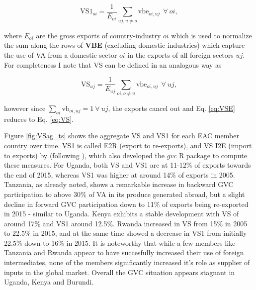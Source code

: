 \documentclass[a4paper]{article}
\begin{document}
\begin{equation} \label{eq:VS1}
\text{VS1}_{oi} = \frac{1}{E_{oi}} \sum_{uj, u \neq  o} \text{vbe}_{oi, uj}\ \ \forall\ oi,
\end{equation}

where $E_{oi}$ are the gross exports of country-industry $oi$ which is used to normalize the sum along the rows of \textbf{VBE} (excluding domestic industries) which capture the use of VA from a domestic sector $oi$ in the exports of all foreign sectors $uj$. For completeness I note that VS can be defined in an analogous way as

\begin{equation} \label{eq:VSE}
\text{VS}_{uj} = \frac{1}{E_{uj}} \sum_{oi, o \neq  u} \text{vbe}_{oi, uj}\ \ \forall\ uj,
\end{equation}

however since $\sum_{oi} \text{vb}_{oi, uj} = 1\ \forall\ uj$, the exports cancel out and Eq. \ref{eq:VSE} reduces to Eq. \ref{eq:VS}. \newline

Figure \ref{fig:VSag_ts} shows the aggregate VS and VS1 for each EAC member country over time. VS1 is called E2R (export to re-exports), and VS I2E (import to exports) by \citet{Kummritz20162} (following \citet{baldwin2015supply}), which also developed the $gvc$ R package to compute these measures. For Uganda, both VS and VS1 are at 11-12\% of exports towards the end of 2015, whereas VS1 was higher at around 14\% of exports in 2005. Tanzania, as already noted, shows a remarkable increase in backward GVC participation to above 30\% of VA in its produce generated abroad, but a slight decline in forward GVC participation down to 11\% of exports being re-exported in 2015 - similar to Uganda. Kenya exhibits a stable development with VS of around 17\% and VS1 around 12.5\%. Rwanda increased in VS from 15\% in 2005 to 22.5\% in 2015, and at the same time showed a decrease in VS1 from initially 22.5\% down to 16\% in 2015. It is noteworthy that while a few members like Tanzania and Rwanda appear to have succesfully increased their use of foreign intermediates, none of the members significantly increased it's role as supplier of inputs in the global market. Overall the GVC situation appears stagnant in Uganda, Kenya and Burundi. 

\end{document}
